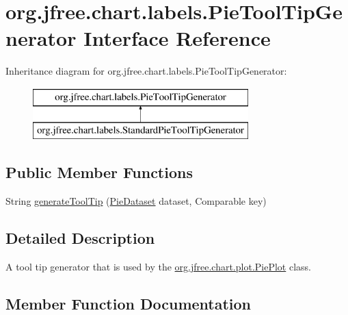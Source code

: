 \hypertarget{interfaceorg_1_1jfree_1_1chart_1_1labels_1_1_pie_tool_tip_generator}{}\section{org.\+jfree.\+chart.\+labels.\+Pie\+Tool\+Tip\+Generator Interface Reference}
\label{interfaceorg_1_1jfree_1_1chart_1_1labels_1_1_pie_tool_tip_generator}
Inheritance diagram for org.\+jfree.\+chart.\+labels.\+Pie\+Tool\+Tip\+Generator\+:\begin{figure}[H]
\begin{center}
\leavevmode
\includegraphics[height=2.000000cm]{interfaceorg_1_1jfree_1_1chart_1_1labels_1_1_pie_tool_tip_generator}
\end{center}
\end{figure}
\subsection*{Public Member Functions}
\begin{DoxyCompactItemize}
\item 
String \mbox{\hyperlink{interfaceorg_1_1jfree_1_1chart_1_1labels_1_1_pie_tool_tip_generator_ae31d3fc9243c9c0d94f8094aaa765493}{generate\+Tool\+Tip}} (\mbox{\hyperlink{interfaceorg_1_1jfree_1_1data_1_1general_1_1_pie_dataset}{Pie\+Dataset}} dataset, Comparable key)
\end{DoxyCompactItemize}


\subsection{Detailed Description}
A tool tip generator that is used by the \mbox{\hyperlink{classorg_1_1jfree_1_1chart_1_1plot_1_1_pie_plot}{org.\+jfree.\+chart.\+plot.\+Pie\+Plot}} class. 

\subsection{Member Function Documentation}
\mbox{\label{interfaceorg_1_1jfree_1_1chart_1_1labels_1_1_pie_tool_tip_generator_ae31d3fc9243c9c0d94f8094aaa765493}} 
